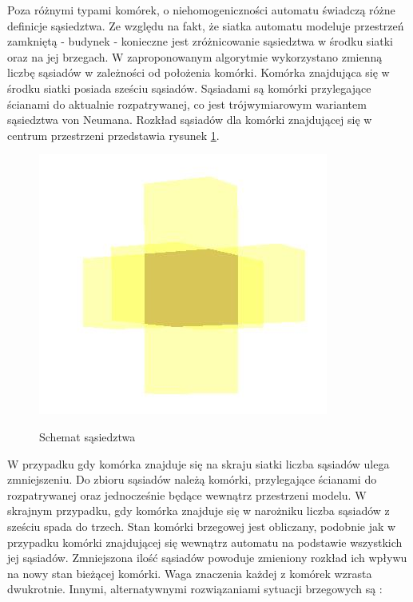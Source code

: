 Poza różnymi typami komórek, o niehomogeniczności automatu świadczą różne definicje sąsiedztwa.
Ze względu na fakt, że siatka automatu modeluje przestrzeń zamkniętą - budynek - konieczne jest zróżnicowanie sąsiedztwa w środku siatki oraz na jej brzegach.
W zaproponowanym algorytmie wykorzystano zmienną liczbę sąsiadów w zależności od położenia komórki. 
Komórka znajdująca się w środku siatki posiada sześciu sąsiadów. Sąsiadami są komórki przylegające ścianami do aktualnie
rozpatrywanej, co jest trójwymiarowym wariantem sąsiedztwa von Neumana. %
 Rozkład sąsiadów dla komórki znajdującej się w centrum przestrzeni przedstawia rysunek \ref{sasiedzi}.
\begin{figure}
\begin {center}
\includegraphics{sasiedztwo.jpg} \\
\caption { Schemat sąsiedztwa}
\label {sasiedzi}
\end {center}
\end{figure}
W przypadku gdy komórka znajduje się na skraju siatki liczba sąsiadów ulega zmniejszeniu. Do zbioru sąsiadów należą komórki, przylegające ścianami do 
rozpatrywanej oraz jednocześnie będące wewnątrz przestrzeni modelu. W skrajnym przypadku, gdy komórka znajduje się w narożniku liczba sąsiadów z sześciu spada
do trzech. Stan komórki brzegowej jest obliczany, podobnie jak w przypadku komórki znajdującej się wewnątrz automatu na podstawie wszystkich jej sąsiadów. Zmniejszona ilość sąsiadów powoduje zmieniony rozkład ich wpływu na nowy stan bieżącej komórki. Waga znaczenia każdej z komórek wzrasta dwukrotnie.
Innymi, alternatywnymi rozwiązaniami sytuacji brzegowych są :
